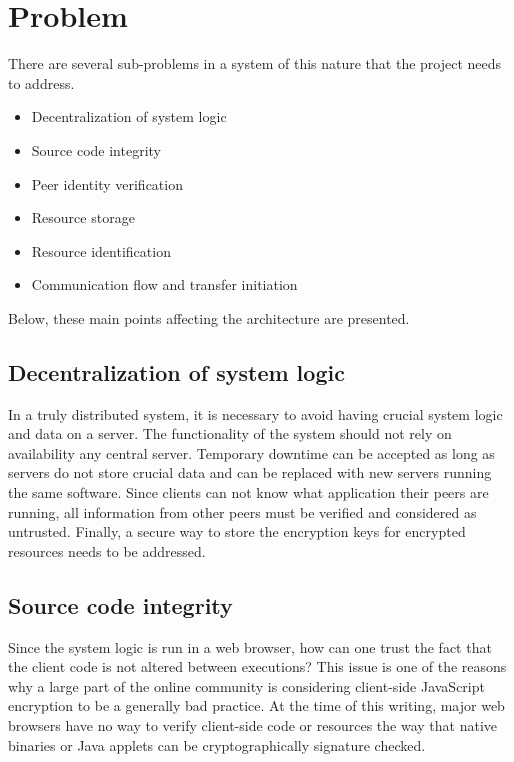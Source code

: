 \section{Problem}
\label{sec:problem}

There are several sub-problems in a system of this nature that the project needs to address.

\begin{itemize}
\item Decentralization of system logic
\item Source code integrity
\item Peer identity verification
\item Resource storage
\item Resource identification
\item Communication flow and transfer initiation
\end{itemize}

Below, these main points affecting the architecture are presented.

\subsection{Decentralization of system logic}
In a truly distributed system, it is necessary to avoid having crucial system logic and data on a server. The functionality of the system should not rely on availability any central server. Temporary downtime can be accepted as long as servers do not store crucial data and can be replaced with new servers running the same software. Since clients can not know what application their peers are running, all information from other peers must be verified and considered as untrusted. Finally, a secure way to store the encryption keys for encrypted resources needs to be addressed.

\subsection{Source code integrity}
Since the system logic is run in a web browser, how can one trust the fact that the client code is not altered between executions? This issue is one of the reasons why a large part of the online community is considering client-side JavaScript encryption to be a generally bad practice. At the time of this writing, major web browsers have no way to verify client-side code or resources the way that native binaries or Java applets can be cryptographically signature checked.

